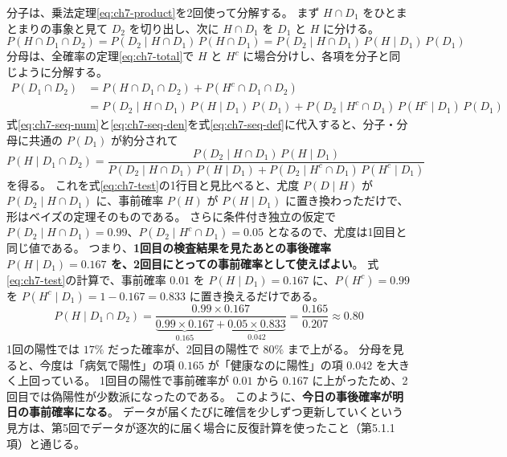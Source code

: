 分子は、乗法定理\eqref{eq:ch7-product}を2回使って分解する。
まず $H \cap D_1$ をひとまとまりの事象と見て $D_2$ を切り出し、次に $H \cap D_1$ を $D_1$ と $H$ に分ける。
\begin{equation}
  P(H \cap D_1 \cap D_2)
  = P(D_2 \mid H \cap D_1)\,P(H \cap D_1)
  = P(D_2 \mid H \cap D_1)\,P(H \mid D_1)\,P(D_1)
  \label{eq:ch7-seq-num}
\end{equation}
分母は、全確率の定理\eqref{eq:ch7-total}で $H$ と $H^c$ に場合分けし、各項を分子と同じように分解する。
\begin{equation}
  \begin{aligned}
    P(D_1 \cap D_2)
    &= P(H \cap D_1 \cap D_2) + P(H^c \cap D_1 \cap D_2) \\
    &= P(D_2 \mid H \cap D_1)\,P(H \mid D_1)\,P(D_1) + P(D_2 \mid H^c \cap D_1)\,P(H^c \mid D_1)\,P(D_1)
  \end{aligned}
  \label{eq:ch7-seq-den}
\end{equation}
式\eqref{eq:ch7-seq-num}と\eqref{eq:ch7-seq-den}を式\eqref{eq:ch7-seq-def}に代入すると、分子・分母に共通の $P(D_1)$ が約分されて
\begin{equation}
  P(H \mid D_1 \cap D_2)
  = \frac{P(D_2 \mid H \cap D_1)\,P(H \mid D_1)}{P(D_2 \mid H \cap D_1)\,P(H \mid D_1) + P(D_2 \mid H^c \cap D_1)\,P(H^c \mid D_1)}
  \label{eq:ch7-seq-bayes}
\end{equation}
を得る。
これを式\eqref{eq:ch7-test}の1行目と見比べると、尤度 $P(D \mid H)$ が $P(D_2 \mid H \cap D_1)$ に、事前確率 $P(H)$ が $P(H \mid D_1)$ に置き換わっただけで、形はベイズの定理そのものである。
さらに条件付き独立の仮定で $P(D_2 \mid H \cap D_1) = 0.99$、$P(D_2 \mid H^c \cap D_1) = 0.05$ となるので、尤度は1回目と同じ値である。
つまり、\textbf{1回目の検査結果を見たあとの事後確率 $P(H \mid D_1) = 0.167$ を、2回目にとっての事前確率として使えばよい}。
式\eqref{eq:ch7-test}の計算で、事前確率 $0.01$ を $P(H \mid D_1) = 0.167$ に、$P(H^c) = 0.99$ を $P(H^c \mid D_1) = 1 - 0.167 = 0.833$ に置き換えるだけである。
\begin{equation*}
  P(H \mid D_1 \cap D_2) = \frac{0.99 \times 0.167}{\underbrace{0.99 \times 0.167}_{0.165} + \underbrace{0.05 \times 0.833}_{0.042}}
  = \frac{0.165}{0.207} \approx 0.80
\end{equation*}
1回の陽性では $17\%$ だった確率が、2回目の陽性で $80\%$ まで上がる。
分母を見ると、今度は「病気で陽性」の項 $0.165$ が「健康なのに陽性」の項 $0.042$ を大きく上回っている。
1回目の陽性で事前確率が $0.01$ から $0.167$ に上がったため、2回目では偽陽性が少数派になったのである。
このように、\textbf{今日の事後確率が明日の事前確率になる}。
データが届くたびに確信を少しずつ更新していくという見方は、第5回でデータが逐次的に届く場合に反復計算を使ったこと（第5.1.1項）と通じる。

